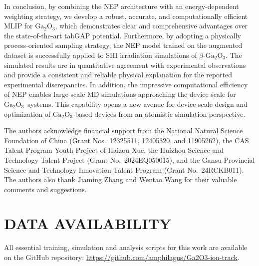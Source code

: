 \documentclass[aip,graphicx,amsmath,amssymb]{revtex4-1}
\newcommand{\ga}{$\text{Ga}_2\text{O}_3$}
\begin{document}
In conclusion, by combining the NEP architecture with an energy-dependent weighting
strategy, we develop a robust, accurate, and computationally efficient MLIP for \ga,
which demonstrates clear and comprehensive advantages over the state-of-the-art tabGAP
potential.
Furthermore, by adopting a physically process-oriented sampling strategy, the NEP model
trained on the augmented dataset is successfully applied to SHI irradiation simulations
of $\beta$-\ga.
The simulated results are in quantitative agreement with experimental observations and
provide a consistent and reliable physical explanation for the reported experimental
discrepancies.
In addition, the impressive computational efficiency of NEP enables large-scale MD
simulations approaching the device scale for \ga\ systems.\cite{xu_device-scale_2025} 
This capability opens a new avenue for device-scale design and optimization of
\ga-based devices from an atomistic simulation perspective.


\begin{acknowledgments}
The authors acknowledge financial support from the National Natural Science Foundation of China
(Grant Nos.~12325511, 12405320, and 11905262),
the CAS Talent Program Youth Project of Haizou Xue,
the Huizhou Science and Technology Talent Project (Grant No.~2024EQ050015),
and the Gansu Provincial Science and Technology Innovation Talent Program (Grant No.~24RCKB011).
The authors also thank Jiaming Zhang and Wentao Wang for their valuable comments and suggestions.
\end{acknowledgments}

\section*{DATA AVAILABILITY}
All essential training, simulation and analysis scripts for this work are available on the 
GitHub repository: \url{https://github.com/amphilagus/Ga2O3-ion-track}.

\appendix
\end{document}
